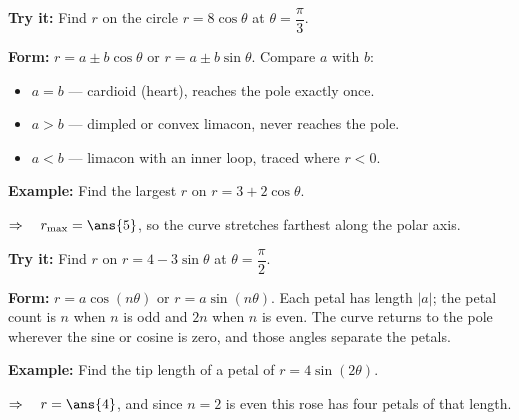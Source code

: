 \documentclass[12pt]{article}
\begin{document}
\begin{tryitbox}
\textbf{Try it:} \quad Find $r$ on the circle $r = 8\cos\theta$ at $\theta = \dfrac{\pi}{3}$.\\[2pt]
\end{tryitbox}


\begin{formulabox}
\textbf{Form:} $r = a \pm b\cos\theta$ or $r = a \pm b\sin\theta$. Compare $a$ with $b$:
\begin{itemize}[leftmargin=0.9cm, itemsep=0pt, topsep=1pt]
  \item $a = b$ --- cardioid (heart), reaches the pole exactly once.
  \item $a > b$ --- dimpled or convex limacon, never reaches the pole.
  \item $a < b$ --- limacon with an inner loop, traced where $r < 0$.
\end{itemize}
\end{formulabox}

\begin{examplebox}
\textbf{Example:} \quad Find the largest $r$ on $r = 3 + 2\cos\theta$.

$\Rightarrow\quad r_{\max} = \ans{5}$, so the curve stretches farthest along the polar axis.
\end{examplebox}

\begin{tryitbox}
\textbf{Try it:} \quad Find $r$ on $r = 4 - 3\sin\theta$ at $\theta = \dfrac{\pi}{2}$.\\[2pt]
\end{tryitbox}


\begin{formulabox}
\textbf{Form:} $r = a\cos(n\theta)$ or $r = a\sin(n\theta)$. Each petal has length $|a|$;
the petal count is $n$ when $n$ is odd and $2n$ when $n$ is even. The curve returns to the
pole wherever the sine or cosine is zero, and those angles separate the petals.
\end{formulabox}

\begin{examplebox}
\textbf{Example:} \quad Find the tip length of a petal of $r = 4\sin(2\theta)$.

$\Rightarrow\quad r = \ans{4}$, and since $n = 2$ is even this rose has four petals of that length.
\end{examplebox}
\end{document}
